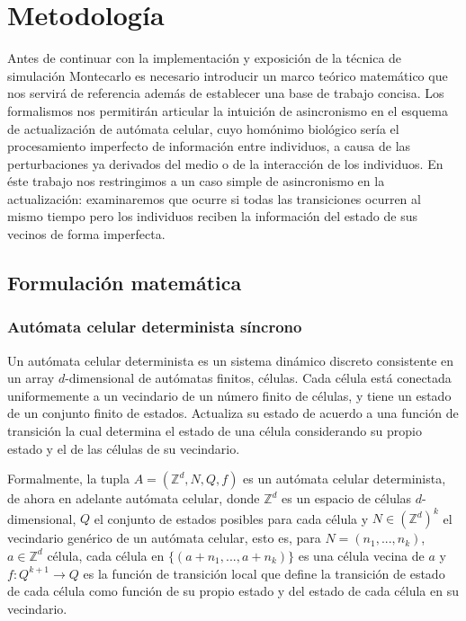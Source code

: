 \documentclass[../proyecto.tex]{memoir}
\begin{document}
\chapter{Metodología}

Antes de continuar con la implementación y exposición de la técnica de simulación Montecarlo es necesario introducir un marco teórico matemático que nos servirá de referencia además de establecer una base de trabajo concisa. Los formalismos nos permitirán articular la intuición de asincronismo en el esquema de actualización de autómata celular, cuyo homónimo biológico sería el procesamiento imperfecto de información entre individuos, a causa de las perturbaciones ya derivados del medio o de la interacción de los individuos. En éste trabajo nos restringimos a un caso simple de asincronismo en la actualización: examinaremos que ocurre si todas las transiciones ocurren al mismo tiempo pero los individuos reciben la información del estado de sus vecinos de forma imperfecta.

\section{Formulación matemática}

\subsection{Autómata celular determinista síncrono}

Un autómata celular determinista es un sistema dinámico discreto consistente en un array $d$-dimensional de autómatas finitos, células. Cada célula está conectada uniformemente a un vecindario de un número finito  de células, y tiene un estado de un conjunto finito de estados. Actualiza su estado de acuerdo a una función de transición la cual determina el estado de una célula considerando su propio estado y el de las células de su vecindario. 

Formalmente, la tupla $A=(\mathds{Z}^{d}, N, Q, f)$ es un autómata celular determinista, de ahora en adelante autómata celular, donde $\mathds{Z} ^{d}$ es un espacio de células $d$-dimensional, $Q$ el conjunto de estados posibles para cada célula y $N \in (\mathds{Z}^{d})^{k}$ el vecindario genérico de un autómata celular, esto es, para $N=(n_{1},...,n_{k})$, $a \in \mathds{Z} ^{d}$ célula, cada célula en $\{(a+n_{1},...,a+n_{k})\}$ es una célula vecina de $a$ y $f:Q^{k+1} \rightarrow Q$ es la función de transición local que define la transición de estado de cada célula como función de su propio estado y del estado de cada célula en su vecindario. 
\end{document}
